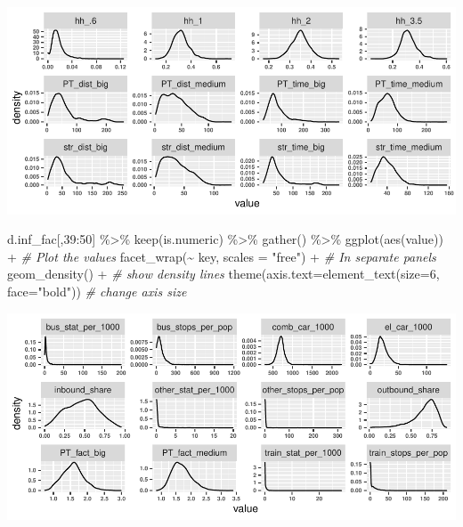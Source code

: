 \documentclass[
]{article}
\newenvironment{Shaded}{\begin{snugshade}}{\end{snugshade}}
\newcommand{\AttributeTok}[1]{\textcolor[rgb]{0.77,0.63,0.00}{#1}}
\newcommand{\CommentTok}[1]{\textcolor[rgb]{0.56,0.35,0.01}{\textit{#1}}}
\newcommand{\DecValTok}[1]{\textcolor[rgb]{0.00,0.00,0.81}{#1}}
\newcommand{\FunctionTok}[1]{\textcolor[rgb]{0.00,0.00,0.00}{#1}}
\newcommand{\NormalTok}[1]{#1}
\newcommand{\SpecialCharTok}[1]{\textcolor[rgb]{0.00,0.00,0.00}{#1}}
\newcommand{\StringTok}[1]{\textcolor[rgb]{0.31,0.60,0.02}{#1}}
\begin{document}
\includegraphics{Lin_Mod_Clus_Analysis_files/figure-latex/unnamed-chunk-4-3.pdf}

\begin{Shaded}
\begin{Highlighting}[]
\NormalTok{d.inf\_fac[,}\DecValTok{39}\SpecialCharTok{:}\DecValTok{50}\NormalTok{] }\SpecialCharTok{\%\textgreater{}\%}
  \FunctionTok{keep}\NormalTok{(is.numeric) }\SpecialCharTok{\%\textgreater{}\%}
  \FunctionTok{gather}\NormalTok{() }\SpecialCharTok{\%\textgreater{}\%}
  \FunctionTok{ggplot}\NormalTok{(}\FunctionTok{aes}\NormalTok{(value))  }\SpecialCharTok{+}                   \CommentTok{\# Plot the values}
    \FunctionTok{facet\_wrap}\NormalTok{(}\SpecialCharTok{\textasciitilde{}}\NormalTok{ key, }\AttributeTok{scales =} \StringTok{"free"}\NormalTok{) }\SpecialCharTok{+}  \CommentTok{\# In separate panels}
    \FunctionTok{geom\_density}\NormalTok{() }\SpecialCharTok{+}                      \CommentTok{\# show density lines}
    \FunctionTok{theme}\NormalTok{(}\AttributeTok{axis.text=}\FunctionTok{element\_text}\NormalTok{(}\AttributeTok{size=}\DecValTok{6}\NormalTok{, }\AttributeTok{face=}\StringTok{"bold"}\NormalTok{)) }\CommentTok{\# change axis size}
\end{Highlighting}
\end{Shaded}

\includegraphics{Lin_Mod_Clus_Analysis_files/figure-latex/unnamed-chunk-4-4.pdf}
\end{document}
